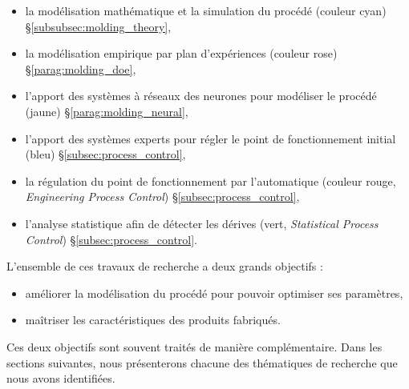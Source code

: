 \begin{itemize}
	\item la modélisation mathématique et la simulation du procédé (couleur cyan) §\ref{subsubsec:molding_theory},
	\item la modélisation empirique par plan d'expériences (couleur rose) §\ref{parag:molding_doe},
	\item l’apport des systèmes à réseaux des neurones pour modéliser le procédé (jaune) §\ref{parag:molding_neural},
	\item l’apport des systèmes experts pour régler le point de fonctionnement initial (bleu) §\ref{subsec:process_control},
	\item la régulation du point de fonctionnement par l'automatique (couleur rouge, \textit{Engineering Process Control}) §\ref{subsec:process_control},
	\item l’analyse statistique afin de détecter les dérives (vert, \textit{Statistical Process Control}) §\ref{subsec:process_control}.
\end{itemize}

\noindent
L'ensemble de ces travaux de recherche a deux grands objectifs :
\begin{itemize}
	\item améliorer la modélisation du procédé pour pouvoir optimiser ses paramètres,
	\item maîtriser les caractéristiques des produits fabriqués.
\end{itemize}
Ces deux objectifs sont souvent traités de manière complémentaire.
Dans les sections suivantes, nous présenterons chacune des thématiques de recherche que nous avons identifiées.

